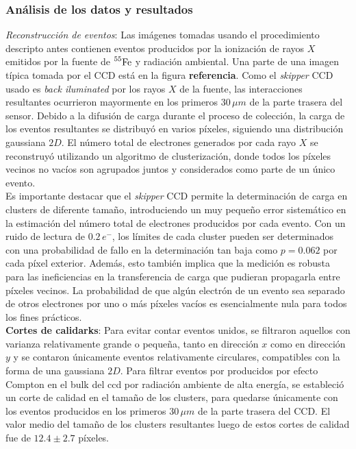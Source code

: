 {\subsubsection{Análisis de los datos y resultados}
\textit{Reconstrucción de eventos}: Las imágenes tomadas usando el procedimiento descripto antes contienen eventos producidos por la ionización de rayos $X$ emitidos por la fuente de $\prescript{55}{}{\mbox{Fe}}$ y radiación ambiental. Una parte de una imagen típica tomada por el CCD está en la figura \textbf{referencia}. Como el \textit{skipper} CCD usado es \textit{back iluminated} por los rayos $X$ de la fuente, las interacciones resultantes ocurrieron mayormente en los primeros $30\,\si{\mu m}$ de la parte trasera del sensor. Debido a la difusión de carga durante el proceso de colección, la carga de los eventos resultantes se distribuyó en varios píxeles, siguiendo una distribución gaussiana $2D$. El número total de electrones generados por cada rayo $X$ se reconstruyó utilizando un algoritmo de clusterización, donde todos los píxeles vecinos no vacíos son agrupados juntos y considerados como parte de un único evento.\\
\indent Es importante destacar que el \textit{skipper} CCD permite la determinación de carga en clusters de diferente tamaño, introduciendo un muy pequeño error sistemático en la estimación del número total de electrones producidos por cada evento. Con un ruido de lectura de $0.2\,e^{-}$, los límites de cada cluster pueden ser determinados con una probabilidad de fallo en la determinación tan baja como $p = 0.062$ por cada píxel exterior. Además, esto también implica que la medición es robusta para las ineficiencias en la transferencia de carga que pudieran propagarla entre píxeles vecinos. La probabilidad de que algún electrón de un evento sea separado de otros electrones por uno o más píxeles vacíos es esencialmente nula para todos los fines prácticos.\\
\indent \textbf{Cortes de calidarks}: Para evitar contar eventos unidos, se filtraron aquellos con varianza relativamente grande o pequeña, tanto en dirección $x$ como en dirección $y$ y se contaron únicamente eventos relativamente circulares, compatibles con la forma de una gaussiana $2D$. Para filtrar eventos por producidos por efecto Compton en el bulk del ccd por radiación ambiente de alta energía, se estableció un corte de calidad en el tamaño de los clusters, para quedarse únicamente con los eventos producidos en los primeros $30\,\si{\mu m}$ de la parte trasera del CCD. El valor medio del tamaño de los clusters resultantes luego de estos cortes de calidad fue de $12.4 \pm 2.7$ píxeles.\\
}
